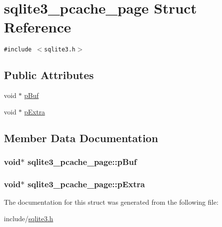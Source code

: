 \hypertarget{structsqlite3__pcache__page}{
\section{sqlite3\_\-pcache\_\-page Struct Reference}
\label{structsqlite3__pcache__page}
}
{\tt \#include $<$sqlite3.h$>$}

\subsection*{Public Attributes}
\begin{CompactItemize}
\item 
void $\ast$ \hyperlink{structsqlite3__pcache__page_19aa6f5638fe2d4eee32aed37a119288}{pBuf}
\item 
void $\ast$ \hyperlink{structsqlite3__pcache__page_6356a15fc426a7558ddf34038f70a65f}{pExtra}
\end{CompactItemize}


\subsection{Member Data Documentation}
\hypertarget{structsqlite3__pcache__page_19aa6f5638fe2d4eee32aed37a119288}{
\subsubsection[pBuf]{\setlength{\rightskip}{0pt plus 5cm}void$\ast$ {\bf sqlite3\_\-pcache\_\-page::pBuf}}}
\label{structsqlite3__pcache__page_19aa6f5638fe2d4eee32aed37a119288}


\hypertarget{structsqlite3__pcache__page_6356a15fc426a7558ddf34038f70a65f}{
\subsubsection[pExtra]{\setlength{\rightskip}{0pt plus 5cm}void$\ast$ {\bf sqlite3\_\-pcache\_\-page::pExtra}}}
\label{structsqlite3__pcache__page_6356a15fc426a7558ddf34038f70a65f}




The documentation for this struct was generated from the following file:\begin{CompactItemize}
\item 
include/\hyperlink{sqlite3_8h}{sqlite3.h}\end{CompactItemize}
